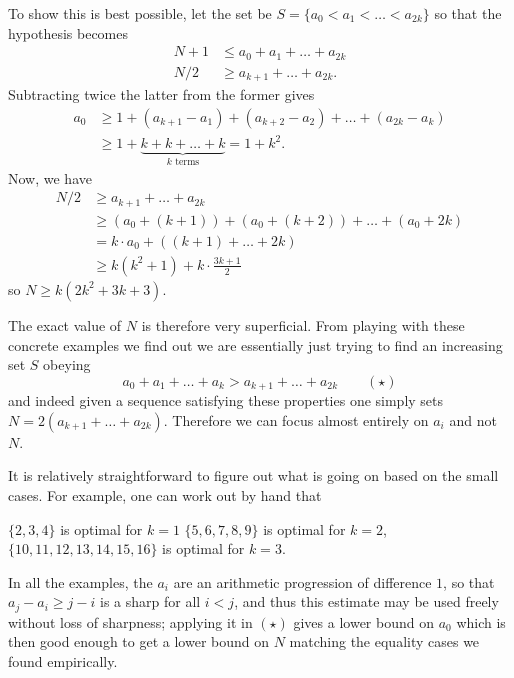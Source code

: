 \documentclass[11pt]{scrartcl}
\begin{document}
To show this is best possible,
let the set be $S = \{ a_0 <  a_1 < \dots < a_{2k} \}$
so that the hypothesis becomes
\begin{align*}
  N + 1 &\le a_0 + a_1 + \dots + a_{2k} \\
  N/2 &\ge a_{k+1} + \dots + a_{2k}.
\end{align*}
Subtracting twice the latter from the former gives
\begin{align*}
  a_0 &\ge 1 + (a_{k+1}-a_1) + (a_{k+2}-a_2) + \dots
  + (a_{2k} - a_k) \\
  &\ge 1 + \underbrace{k + k + \dots + k}_{k \text{ terms}} = 1 + k^2.
\end{align*}
Now, we have
\begin{align*}
  N/2 &\ge a_{k+1} + \dots + a_{2k} \\
  &\ge (a_0 + (k+1)) + (a_0 + (k+2)) + \dots + (a_0 + 2k) \\
  &= k \cdot a_0 + \left( (k+1) + \dots + 2k \right) \\
  &\ge k(k^2+1) + k \cdot \frac{3k+1}{2}
\end{align*}
so $N \ge k(2k^2+3k+3)$.

\begin{remark*}
  The exact value of $N$ is therefore very superficial.
  From playing with these concrete examples
  we find out we are essentially
  just trying to find an increasing set $S$ obeying
  \[ a_0 + a_1 + \dots + a_k > a_{k+1} + \dots + a_{2k} \qquad (\star) \]
  and indeed given a sequence satisfying these properties
  one simply sets $N = 2(a_{k+1} + \dots + a_{2k})$.
  Therefore we can focus almost entirely on $a_i$ and not $N$.
\end{remark*}

\begin{remark*}
  It is relatively straightforward to figure out what is going on
  based on the small cases.
  For example, one can work out by hand that
  \begin{itemize}
    \ii $\{2,3,4\}$ is optimal for $k=1$
    \ii $\{5,6,7,8,9\}$ is optimal for $k=2$,
    \ii $\{10,11,12,13,14,15,16\}$ is optimal for $k=3$.
  \end{itemize}
  In all the examples,
  the $a_i$ are an arithmetic progression of difference $1$,
  so that $a_j - a_i \ge j-i$ is a sharp for all $i<j$,
  and thus this estimate may be used freely without loss of sharpness;
  applying it in $(\star)$ gives a lower bound on $a_0$
  which is then good enough to get a lower bound on $N$
  matching the equality cases we found empirically.
\end{remark*}
\pagebreak
\end{document}
